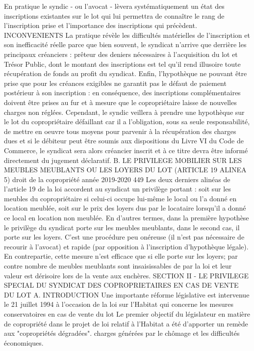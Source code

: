 En pratique le syndic - ou l'avocat - lèvera systématiquement un état des inscriptions existantes sur le lot qui lui permettra de connaître le rang de l'inscription prise et l'importance des inscriptions qui précèdent.
INCONVENIENTS
La pratique révèle les difficultés matérielles de l'inscription et son inefficacité réelle parce que bien souvent, le syndicat n'arrive que derrière les principaux créanciers : prêteur des deniers nécessaires à l'acquisition du lot et Trésor Public, dont le montant des inscriptions est tel qu'il rend illusoire toute récupération de fonds au profit du syndicat.
Enfin, l'hypothèque ne pouvant être prise que pour les créances exigibles ne garantit pas le défaut de paiement postérieur à son inscription : en conséquence, des inscriptions complémentaires doivent être prises au fur et à mesure que le copropriétaire laisse de nouvelles charges non réglées.
Cependant, le syndic veillera à prendre une hypothèque sur le lot du copropriétaire défaillant car il a l'obligation, sous sa seule responsabilité, de mettre en oeuvre tous moyens pour parvenir à la récupération des charges dues et si le débiteur peut être soumis aux dispositions du Livre VI du Code de Commerce, le syndicat sera alors créancier inscrit et à ce titre devra être informé directement du jugement déclaratif.
B. LE PRIVILEGE MOBILIER SUR LES MEUBLES MEUBLANTS OU LES LOYERS DU LOT (ARTICLE 19 ALINEA 5)
droit de la copropriété année 2019-2020
449
Les deux derniers alinéas de l'article 19 de la loi accordent au syndicat un privilège portant :
soit sur les meubles du copropriétaire si celui-ci occupe lui-même le local ou l'a donné en location meublée,
soit sur le prix des loyers dus par le locataire lorsqu'il a donné ce local en location non meublée.
En d'autres termes, dans la première hypothèse le privilège du syndicat porte sur les meubles meublants, dans le second cas, il porte sur les loyers.
C'est une procédure peu onéreuse (il n'est pas nécessaire de recourir à l'avocat) et rapide (par opposition à l'inscription d'hypothèque légale). En contrepartie, cette mesure n'est efficace que si elle porte sur les loyers; par contre nombre de meubles meublants sont insaisissables de par la loi et leur valeur est dérisoire lors de la vente aux enchères.
SECTION II - LE PRIVILEGE SPECIAL DU SYNDICAT DES COPROPRIETAIRES EN CAS DE VENTE DU LOT
A. INTRODUCTION
Une importante réforme législative est intervenue le 21 juillet 1994 à l'occasion de la loi sur l'Habitat qui concerne les mesures conservatoires en cas de vente du lot
Le premier objectif du législateur en matière de copropriété dans le projet de loi relatif à l'Habitat a été d'apporter un remède aux "copropriétés dégradées". charges générées par le chômage et les difficultés économiques.
